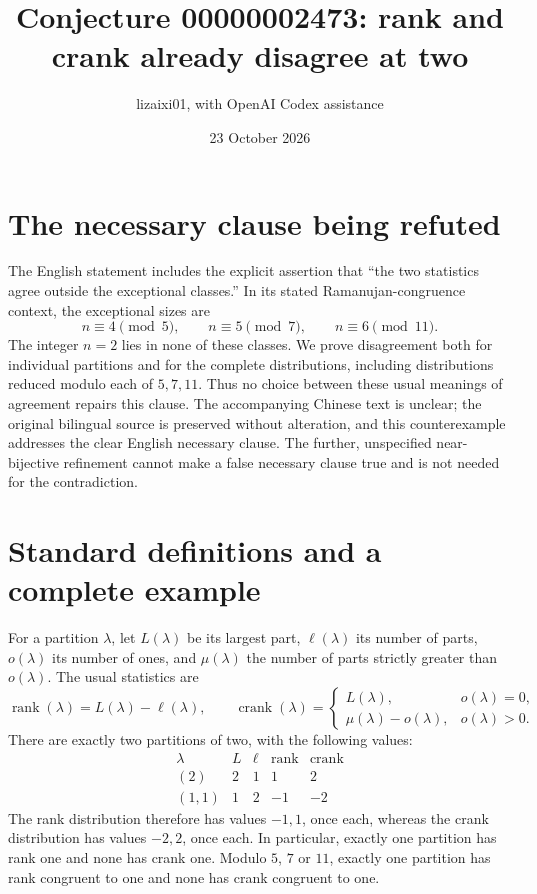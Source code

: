 \documentclass[11pt]{article}
\title{Conjecture 00000002473: rank and crank already disagree at two}
\author{lizaixi01, with OpenAI Codex assistance}
\date{23 October 2026}
\begin{document}
\maketitle
\section{The necessary clause being refuted}
The English statement includes the explicit assertion that
``the two statistics agree outside the exceptional classes.''
In its stated Ramanujan-congruence context, the exceptional sizes are
\[
 n\equiv4\pmod5,\qquad n\equiv5\pmod7,\qquad n\equiv6\pmod{11}.
\]
The integer $n=2$ lies in none of these classes. We prove disagreement
both for individual partitions and for the complete distributions,
including distributions reduced modulo each of $5,7,11$. Thus no
choice between these usual meanings of agreement repairs this clause.
The accompanying Chinese text is unclear; the original bilingual
source is preserved without alteration, and this counterexample
addresses the clear English necessary clause. The further,
unspecified near-bijective refinement cannot make a false necessary
clause true and is not needed for the contradiction.

\section{Standard definitions and a complete example}
For a partition $\lambda$, let $L(\lambda)$ be its largest part,
$\ell(\lambda)$ its number of parts, $o(\lambda)$ its number of ones,
and $\mu(\lambda)$ the number of parts strictly greater than
$o(\lambda)$. The usual statistics are
\[
 \operatorname{rank}(\lambda)=L(\lambda)-\ell(\lambda),\qquad
 \operatorname{crank}(\lambda)=
 \begin{cases}
  L(\lambda),&o(\lambda)=0,\\
  \mu(\lambda)-o(\lambda),&o(\lambda)>0.
 \end{cases}
\]
There are exactly two partitions of two, with the following values:
\[
\begin{array}{c|r|r|r|r}
\lambda &L&\ell&\operatorname{rank}&\operatorname{crank}\\\hline
(2)&2&1&1&2\\
(1,1)&1&2&-1&-2
\end{array}
\]
The rank distribution therefore has values $-1,1$, once each,
whereas the crank distribution has values $-2,2$, once each.
In particular, exactly one partition has rank one and none has
crank one. Modulo $5$, $7$ or $11$, exactly one partition has
rank congruent to one and none has crank congruent to one.
\end{document}
